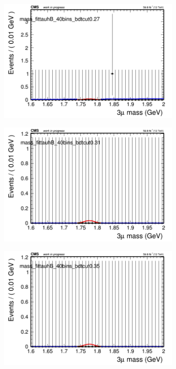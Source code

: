 \begin{figure}[H]
\begin{subfigure}{0.2\textwidth}
        \includegraphics[width=\textwidth]{power_law/plots/tauhB/massfit_tauhB_40bins_bdtcut0.27.png}
        \caption{}
    \end{subfigure}
    \begin{subfigure}{0.2\textwidth}
        \includegraphics[width=\textwidth]{power_law/plots/tauhB/massfit_tauhB_40bins_bdtcut0.31.png}
        \caption{}
    \end{subfigure}
    \begin{subfigure}{0.2\textwidth}
        \includegraphics[width=\textwidth]{power_law/plots/tauhB/massfit_tauhB_40bins_bdtcut0.35.png}

\end{subfigure}
\end{figure}
